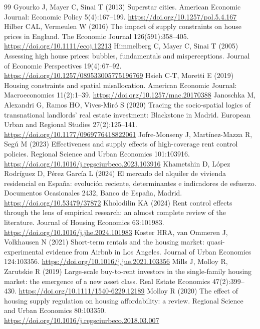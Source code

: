 \begin{thebibliography}{99}
 Gyourko J, Mayer C, Sinai T (2013) Superstar cities. American Economic Journal: Economic Policy 5(4):167--199. \url{https://doi.org/10.1257/pol.5.4.167}
 Hilber CAL, Vermeulen W (2016) The impact of supply constraints on house prices in England. The Economic Journal 126(591):358--405. \url{https://doi.org/10.1111/ecoj.12213}
 Himmelberg C, Mayer C, Sinai T (2005) Assessing high house prices: bubbles, fundamentals and misperceptions. Journal of Economic Perspectives 19(4):67--92. \url{https://doi.org/10.1257/089533005775196769}
 Hsieh C-T, Moretti E (2019) Housing constraints and spatial misallocation. American Economic Journal: Macroeconomics 11(2):1--39. \url{https://doi.org/10.1257/mac.20170388}
 Janoschka M, Alexandri G, Ramos HO, Vives-Miró S (2020) Tracing the socio-spatial logics of transnational landlords' real estate investment: Blackstone in Madrid. European Urban and Regional Studies 27(2):125--141. \url{https://doi.org/10.1177/0969776418822061}
 Jofre-Monseny J, Martínez-Mazza R, Segú M (2023) Effectiveness and supply effects of high-coverage rent control policies. Regional Science and Urban Economics 101:103916. \url{https://doi.org/10.1016/j.regsciurbeco.2023.103916}
 Khametshin D, López Rodríguez D, Pérez García L (2024) El mercado del alquiler de vivienda residencial en España: evolución reciente, determinantes e indicadores de esfuerzo. Documentos Ocasionales 2432, Banco de España, Madrid. \url{https://doi.org/10.53479/37872}
 Kholodilin KA (2024) Rent control effects through the lens of empirical research: an almost complete review of the literature. Journal of Housing Economics 63:101983. \url{https://doi.org/10.1016/j.jhe.2024.101983}
 Koster HRA, van Ommeren J, Volkhausen N (2021) Short-term rentals and the housing market: quasi-experimental evidence from Airbnb in Los Angeles. Journal of Urban Economics 124:103356. \url{https://doi.org/10.1016/j.jue.2021.103356}
 Mills J, Molloy R, Zarutskie R (2019) Large-scale buy-to-rent investors in the single-family housing market: the emergence of a new asset class. Real Estate Economics 47(2):399--430. \url{https://doi.org/10.1111/1540-6229.12189}
 Molloy R (2020) The effect of housing supply regulation on housing affordability: a review. Regional Science and Urban Economics 80:103350. \url{https://doi.org/10.1016/j.regsciurbeco.2018.03.007}

\end{thebibliography}
